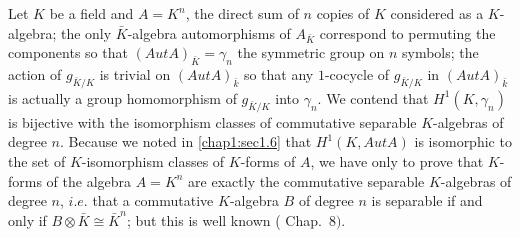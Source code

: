 \begin{exam}\label{chap1:exam2}
Let $K$ be a field and $A=K^{n}$, the direct sum of $n$ copies of $K$
considered as a $K$-algebra; the only $\bar{K}$-algebra automorphisms
of $A_{\bar{K}}$ correspond to permuting the components so that $(Aut
A)_{\bar{K}}= \gamma_{n}$  the symmetric group  on $n$ symbols;  the
action of $g_{\bar{K}/K}$ is trivial on $(Aut A)_{\bar{k}}$ so that
any $1$-cocycle of $g_{\bar{K}/K}$ in  $(Aut A)_{\bar{k}}$ is actually
a group homomorphism of $g_{\bar{K}/K}$ into $\gamma_{n}$. We contend
that  $H^1 (K,\gamma_{n})$ is bijective with the isomorphism classes
of commutative separable $K$-algebras of degree $n$. Because we noted
in \ref{chap1:sec1.6} that  $H^1 (K, Aut A)$ is isomorphic to the set of
$K$-isomorphism classes of $K$-forms of $A$, we have only to prove
that $K$-forms of the algebra  $A=K^n$ are exactly the commutative
separable $K$-algebras of degree $n$, $i.e$. that a commutative
$K$-algebra $B$ of degree $n$ is  separable if and only if $B \otimes
\bar{K} \cong \bar{K}^{n}$; but this is well known (\cite{keyB} Chap.~$8)$.  
\end{exam}

